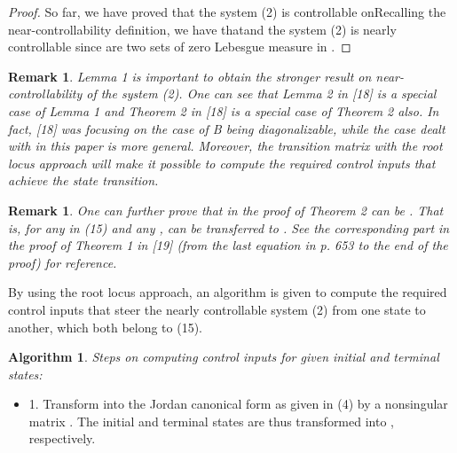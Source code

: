 \documentclass[journal,a4paper,12pt,onecolumn]{IEEEtran}
\newtheorem{algorithm}[theorem]{Algorithm}
\newtheorem{remark}[theorem]{Remark}
\begin{document}
\begin{proof}
So far, we have proved that the system (2) is controllable onRecalling the near-controllability definition, we have thatand the system (2) is nearly controllable since 
are two sets of zero Lebesgue measure in .
\end{proof}



\begin{remark}
Lemma 1 is important to obtain the stronger result on near-controllability
of the system (2). One can see that Lemma 2 in [18] is a special case of
Lemma 1 and Theorem 2 in [18] is a special case of Theorem 2 also. In fact,
[18] was focusing on the case of B being diagonalizable, while the case
dealt with in this paper is more general. Moreover, the \textit{transition}
matrix  with the root locus approach will make it
possible to compute the required control inputs that achieve the state
transition.
\end{remark}



\begin{remark}
One can further prove that  in the proof of Theorem 2 can be . That is, for any  in (15) and any ,  can be transferred to . See the corresponding part in
the proof of Theorem 1 in [19] (from the last equation in p. 653 to the end
of the proof) for reference.
\end{remark}



By using the root locus approach, an algorithm is given to compute the
required control inputs that steer the nearly controllable system (2) from
one state to another, which both belong to (15).



\begin{algorithm}
Steps on computing control inputs for given initial and terminal states:
\end{algorithm}

\begin{itemize}
\item 1. Transform  into the Jordan canonical form as given in (4) by a
nonsingular matrix . The initial and terminal states  are
thus transformed into , respectively.
\end{itemize}
\end{document}
